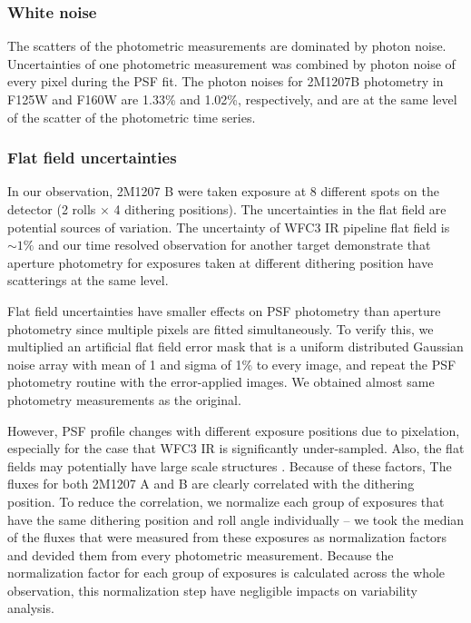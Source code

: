 \documentclass[apj]{emulateapj}
\begin{document}
\subsubsection{White noise}
The scatters of the photometric measurements are dominated by photon
noise. Uncertainties of one photometric measurement was combined by
photon noise of every pixel during the PSF fit. The photon noises for
2M1207B photometry in F125W and F160W are 1.33\% and 1.02\%,
respectively, and are at the same level of the scatter of the
photometric time series.

\subsubsection{Flat field uncertainties}
In our observation, 2M1207 B were taken exposure at 8 different spots
on the detector (2 rolls $\times$ 4 dithering
positions). The uncertainties in the flat field are potential sources of variation. The uncertainty of WFC3 IR pipeline flat field
is $\sim 1\%$ \citep{dressel2012wide} and our time resolved observation for another target
demonstrate that aperture photometry for exposures taken at different
dithering position have scatterings at the same level.

Flat field uncertainties have smaller effects on PSF photometry than
aperture photometry since multiple pixels are fitted
simultaneously. To verify this, we multiplied an artificial flat field
error mask that is a uniform distributed Gaussian noise array with
mean of 1 and sigma of 1\% to every image, and repeat the PSF
photometry routine with the error-applied images. We obtained almost
same photometry measurements as the original.

However, PSF profile changes with different exposure positions due to
pixelation, especially for the case that WFC3 IR is significantly
under-sampled. Also, the flat fields may potentially have large scale
structures \citep{dressel2012wide}. Because of these factors, The
fluxes for both 2M1207 A and B are clearly correlated with the
dithering position. To reduce the correlation, we normalize each group of exposures
that have the same dithering position and roll angle individually --
we took the median of the fluxes that were measured from these
exposures as normalization factors and devided them from every photometric
measurement. Because the normalization factor for each group of
exposures is calculated across the whole observation, this
normalization step have negligible impacts on variability analysis.
\end{document}
